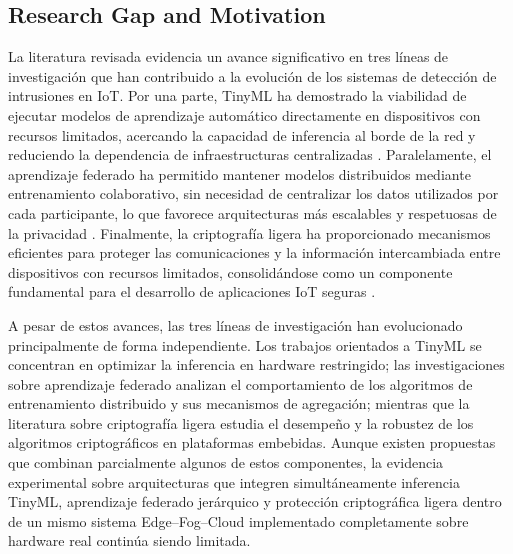 \documentclass[journal,article,submit,moreauthors]{Definitions/mdpi}
\begin{document}
\subsection{Research Gap and Motivation}
La literatura revisada evidencia un avance significativo en tres líneas de investigación que han contribuido a la evolución de los sistemas de detección de intrusiones en IoT. Por una parte, TinyML ha demostrado la viabilidad de ejecutar modelos de aprendizaje automático directamente en dispositivos con recursos limitados, acercando la capacidad de inferencia al borde de la red y reduciendo la dependencia de infraestructuras centralizadas \cite{Tekin2023,Amuthadevi2025,Dini2024}. Paralelamente, el aprendizaje federado ha permitido mantener modelos distribuidos mediante entrenamiento colaborativo, sin necesidad de centralizar los datos utilizados por cada participante, lo que favorece arquitecturas más escalables y respetuosas de la privacidad \cite{McMahan2017,Imteaj2022,Hajj2023,Ramadan2025}. Finalmente, la criptografía ligera ha proporcionado mecanismos eficientes para proteger las comunicaciones y la información intercambiada entre dispositivos con recursos limitados, consolidándose como un componente fundamental para el desarrollo de aplicaciones IoT seguras \cite{NIST800232,Kaur2025,Gusita2025}.

A pesar de estos avances, las tres líneas de investigación han evolucionado principalmente de forma independiente. Los trabajos orientados a TinyML se concentran en optimizar la inferencia en hardware restringido; las investigaciones sobre aprendizaje federado analizan el comportamiento de los algoritmos de entrenamiento distribuido y sus mecanismos de agregación; mientras que la literatura sobre criptografía ligera estudia el desempeño y la robustez de los algoritmos criptográficos en plataformas embebidas. Aunque existen propuestas que combinan parcialmente algunos de estos componentes, la evidencia experimental sobre arquitecturas que integren simultáneamente inferencia TinyML, aprendizaje federado jerárquico y protección criptográfica ligera dentro de un mismo sistema Edge--Fog--Cloud implementado completamente sobre hardware real continúa siendo limitada.
%
\end{document}
